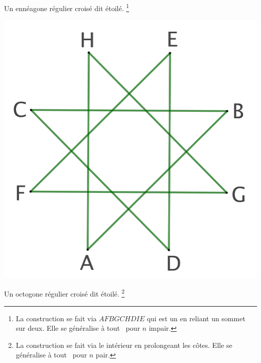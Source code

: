 \begin{remark}
\begin{multicols}{2}
        \smallskip
        Un ennéagone régulier croisé dit étoilé.%
	    \footnote{
	        La construction se fait via $AFBGCHDIE$ qui est un  en reliant un sommet sur deux. Elle se généralise à tout \nreg\ pour $n$ impair.
	    }


    	\columnbreak
	
	    \null\vfill
	    
	    \includegraphics[scale=.185]{content/polygon/ncycle-ngone/8-iso-non-conv.png}
    
        \smallskip
        Un octogone régulier croisé dit étoilé.%
	    \footnote{
	        La construction se fait via le  intérieur en prolongeant les côtes. Elle se généralise à tout \nreg\ pour $n$ pair.
	    }

    \end{multicols}
\end{remark}
